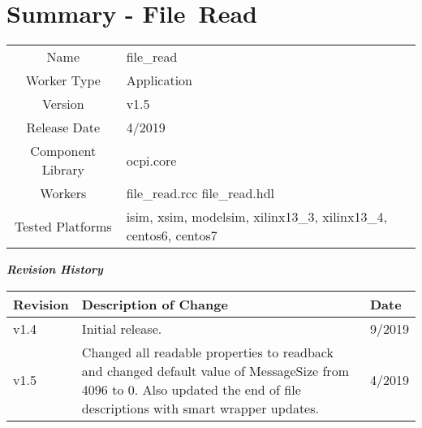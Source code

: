 \documentclass{article}
\author{} %
\date{Version \docVersion} %
\title{\docTitle}
\def\docVersion{1.5}
\def\comp{file\_read}
\def\Comp{File\ Read }
\begin{document}
\section*{Summary - \Comp}
\begin{tabular}{|c|M{13.5cm}|}
	\hline
	                  &                                                                                \\
	\hline
	Name              & \comp                                                                          \\
	\hline
	Worker Type       & Application                                                                    \\
	\hline
	Version           &  v\docVersion \\
	\hline
	Release Date      &  4/2019 \\
	\hline
	Component Library &   ocpi.core\\
	\hline
	Workers           &  file\_read.rcc file\_read.hdl\\
	\hline
	Tested Platforms  &  isim, xsim, modelsim, xilinx13\_3, xilinx13\_4, centos6, centos7\\
	\hline
\end{tabular}

\begin{center}
  \textit{\textbf{Revision History}}
\end{center}
\begin{longtable}{|p{}
                  |p{}
                  |p{}|}
  \hline
  \rowcolor{blue}
  \textbf{Revision} & \textbf{Description of Change} & \textbf{Date} \\
  \hline
  v1.4 & Initial release. & 9/2019 \\
  \hline
  v1.5 & Changed all readable properties to readback and changed default value of MessageSize from 4096 to 0. Also updated the end of file descriptions with smart wrapper updates.  & 4/2019 \\
  \hline
\end{longtable}
\end{document}
